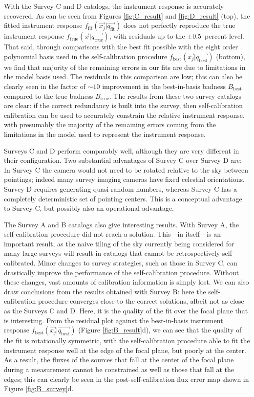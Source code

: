 \documentclass[preprint,pdftex]{aastex}
\newcommand{\true}{\text{true}}
\newcommand{\fit}{\text{fit}}
\newcommand{\basis}{\text{best}}
\begin{document}
With the Survey C and D catalogs, the instrument response is accurately recovered. As can be seen from Figures \ref{fig:C_result} and \ref{fig:D_result} (top), the fitted instrument response $f_\fit(\vec{x_j} | \vec{q_\fit})$ does not perfectly reproduce the true instrument response $f_\true(\vec{x} | \vec{q_\true})$, with residuals up to the $\pm 0.5$~percent level. That said, through comparisons with the best fit possible with the eight order polynomial basis used in the self-calibration procedure $f_\basis(\vec{x_j} | \vec{q_\basis})$ (bottom), we find that majority of the remaining errors in our fits are due to limitations in the model basis used. The residuals in this comparison are low; this can also be clearly seen in the factor of $\sim 10$ improvement in the best-in-basis badness $B_\basis$ compared to the true badness $B_\true$. The results from these two survey catalogs are clear: if the correct redundancy is built into the survey, then self-calibration calibration can be used to accurately constrain the relative instrument response, with presumably the majority of the remaining errors coming from the limitations in the model used to represent the instrument response. 

Surveys C and D perform comparably well, although they are very different in their configuration. Two substantial advantages of Survey C over Survey D are: In Survey C the camera would not need to be rotated relative to the sky between pointings; indeed many survey imaging cameras have fixed celestial orientations. Survey D requires generating quasi-random numbers, whereas Survey C has a completely deterministic set of pointing centers. This is a conceptual advantage to Survey C, but possibly also an operational advantage. 

The Survey A and B catalogs also give interesting results. With Survey A, the self-calibration procedure did not reach a solution. This---in itself---is an important result, as the naive tiling of the sky currently being considered for many large surveys will result in catalogs that cannot be retrospectively self-calibrated. Minor changes to survey strategies, such as those in Survey C, can drastically improve the performance of the self-calibration procedure. Without these changes, vast amounts of calibration information is simply lost. We can also draw conclusions from the results obtained with Survey B: here the self-calibration procedure converges close to the correct solutions, albeit not as close as the Surveys C and D. Here, it is the quality of the fit over the focal plane that is interesting. From the residual plot against the best-in-basis instrument response $f_\basis(\vec{x_j} | \vec{q_\basis})$ (Figure \ref{fig:B_result}d), we can see that the quality of the fit is rotationally symmetric, with the self-calibration procedure able to fit the instrument response well at the edge of the focal plane, but poorly at the center. As a result, the fluxes of the sources that fall at the center of the focal plane during a measurement cannot be constrained as well as those that fall at the edges; this can clearly be seen in the post-self-calibration flux error map shown in Figure \ref{fig:B_survey}d.
\end{document}

